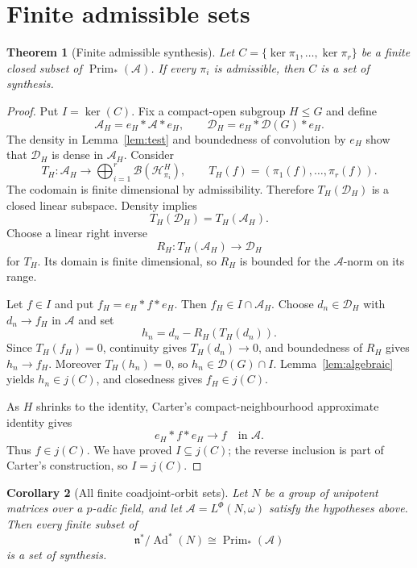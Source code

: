\documentclass[11pt]{article}
\newtheorem{theorem}{Theorem}
\newtheorem{corollary}[theorem]{Corollary}
\newcommand{\A}{\mathcal A}
\newcommand{\D}{\mathcal D}
\newcommand{\Prim}{\operatorname{Prim}}
\newcommand{\Ad}{\operatorname{Ad}}
\begin{document}
\section{Finite admissible sets}

\begin{theorem}[Finite admissible synthesis]\label{thm:admissible}
Let $C=\{\ker\pi_1,\ldots,\ker\pi_r\}$ be a finite closed subset of
$\Prim_*(\A)$.  If every $\pi_i$ is admissible, then $C$ is a set of
synthesis.
\end{theorem}

\begin{proof}
Put $I=\ker(C)$.  Fix a compact-open subgroup $H\leq G$ and define
\[
 \A_H=e_H*\A*e_H,
 \qquad
 \D_H=e_H*\D(G)*e_H.
\]
The density in Lemma~\ref{lem:test} and boundedness of convolution by $e_H$
show that $\D_H$ is dense in $\A_H$.  Consider
\[
 T_H:\A_H\longrightarrow
 \bigoplus_{i=1}^r
 \mathcal B(\mathcal H_{\pi_i}^H),
 \qquad T_H(f)=(\pi_1(f),\ldots,\pi_r(f)).
\]
The codomain is finite dimensional by admissibility.  Therefore
$T_H(\D_H)$ is a closed linear subspace.  Density implies
\[
 T_H(\D_H)=T_H(\A_H).
\]
Choose a linear right inverse
\[
 R_H:T_H(\A_H)\longrightarrow\D_H
\]
for $T_H$.  Its domain is finite dimensional, so $R_H$ is bounded for the
$\A$-norm on its range.

Let $f\in I$ and put $f_H=e_H*f*e_H$.  Then $f_H\in I\cap\A_H$.  Choose
$d_n\in\D_H$ with $d_n\to f_H$ in $\A$ and set
\[
 h_n=d_n-R_H(T_H(d_n)).
\]
Since $T_H(f_H)=0$, continuity gives $T_H(d_n)\to0$, and boundedness of $R_H$
gives $h_n\to f_H$.  Moreover $T_H(h_n)=0$, so
$h_n\in\D(G)\cap I$.  Lemma~\ref{lem:algebraic} yields $h_n\in j(C)$, and
closedness gives $f_H\in j(C)$.

As $H$ shrinks to the identity, Carter's compact-neighbourhood approximate
identity \cite[Proposition 2.16(ii)]{Carter} gives
\[
 e_H*f*e_H\longrightarrow f
 \quad\text{in }\A.
\]
Thus $f\in j(C)$.  We have proved $I\subseteq j(C)$; the reverse inclusion is
part of Carter's construction, so $I=j(C)$.
\end{proof}

\begin{corollary}[All finite coadjoint-orbit sets]\label{cor:padic}
Let $N$ be a group of unipotent matrices over a $p$-adic field, and let
$\A=L^\Phi(N,\omega)$ satisfy the hypotheses above.  Then every finite subset
of
\[
 \mathfrak n^*/\Ad^*(N)\cong\Prim_*(\A)
\]
is a set of synthesis.
\end{corollary}
\end{document}
